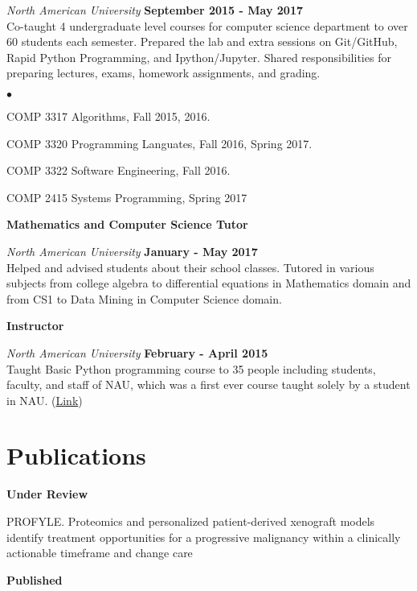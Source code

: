 \documentclass[margin,line]{res}
\newenvironment{list2}{
  \begin{list}{$\bullet$}{%
      \setlength{\itemsep}{0in}
      \setlength{\parsep}{0in} \setlength{\parskip}{0in}
      \setlength{\topsep}{0in} \setlength{\partopsep}{0in}
      \setlength{\leftmargin}{0.2in}}}{\end{list}}
\begin{document}
\begin{resume}
\vspace{-.3cm}
{\em North American University} \hfill {\bf September 2015 - May 2017}\\
Co-taught 4 undergraduate level courses for computer science department to over 60 students each semester. Prepared the lab and extra sessions on Git/GitHub, Rapid Python Programming, and Ipython/Jupyter. Shared responsibilities for preparing lectures, exams, homework assignments, and  grading.
\vspace*{.05in}
\begin{list2}
\item COMP 3317 Algorithms, Fall 2015, 2016.
\item COMP 3320 Programming Languates, Fall 2016, Spring 2017.
\item COMP 3322 Software Engineering, Fall 2016.
\item COMP 2415 Systems Programming, Spring 2017
\end{list2}


{\bf Mathematics and Computer Science Tutor}
\vspace{-.1cm}

{\em North American University} \hfill {\bf January - May 2017}\\
Helped and advised students about their school classes. Tutored in various subjects from college algebra to differential equations in Mathematics domain and from CS1 to Data Mining in Computer Science domain.

{\bf Instructor}
\vspace{-.1cm}

{\em North American University} \hfill {\bf February - April 2015}\\
Taught Basic Python programming course to 35 people including students, faculty, and staff of NAU, which was a first ever course taught solely by a student in NAU. (\href{https://github.com/NAU-Python-Class/Py101-Spring-15}{Link})


\section{\sc Publications}
{\bf Under Review}

\vspace*{-.3cm}
PROFYLE. Proteomics and personalized patient-derived xenograft models identify treatment opportunities for a progressive malignancy within a clinically actionable timeframe and change care

{\bf Published}


\end{resume}
\end{document}

